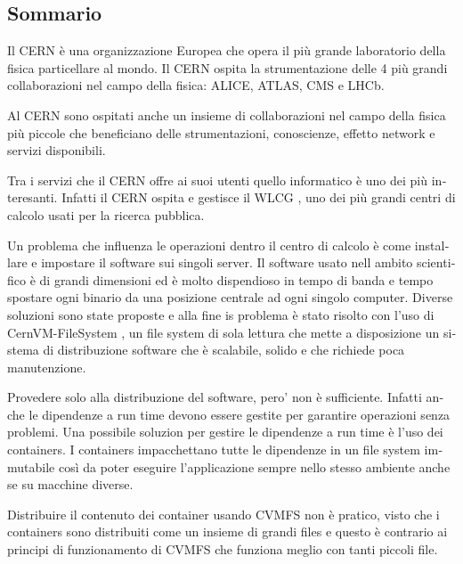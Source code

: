 \begin{otherlanguage}{italian}
\chapter*{Sommario}

Il CERN è una organizzazione Europea che opera il più grande laboratorio
        della fisica particellare al mondo.
Il CERN ospita la strumentazione delle 4 più grandi collaborazioni nel campo
        della fisica: ALICE, ATLAS, CMS e LHCb.

Al CERN sono ospitati anche un insieme di collaborazioni nel campo della fisica
        più piccole che beneficiano delle strumentazioni, conoscienze, effetto
        network e servizi disponibili.

Tra i servizi che il CERN offre ai suoi utenti quello informatico è uno dei
        più interesanti. Infatti il CERN ospita e gestisce il WLCG
        \cite{grid:website}, uno dei più grandi centri di calcolo usati per la
        ricerca pubblica.

Un problema che influenza le operazioni dentro il centro di calcolo è
        come installare e impostare il software sui singoli server. Il
        software usato nell ambito scientifico è di grandi dimensioni ed è molto
        dispendioso in tempo di banda e tempo spostare ogni binario da una
        posizione centrale ad ogni singolo computer. Diverse soluzioni sono
        state proposte e alla fine is problema è stato risolto con l'uso di
        CernVM-FileSystem \cite{cvmfs}, un file system di sola lettura che mette a
        disposizione un sistema di distribuzione software che è scalabile,
        solido e che richiede poca manutenzione.

Provedere solo alla distribuzione del software, pero' non è sufficiente.
        Infatti anche le dipendenze a run time devono essere gestite per
        garantire operazioni senza problemi. Una possibile soluzion per gestire le
        dipendenze a run time è l'uso dei containers. I containers
        impacchettano tutte le dipendenze in un file system immutabile così da
        poter eseguire l'applicazione sempre nello stesso ambiente anche se su
        macchine diverse.

Distribuire il contenuto dei container usando CVMFS non è pratico, visto che
        i containers sono distribuiti come un insieme di grandi files e questo
        è contrario ai principi di funzionamento di CVMFS che funziona meglio
        con tanti piccoli file.


\end{otherlanguage}
